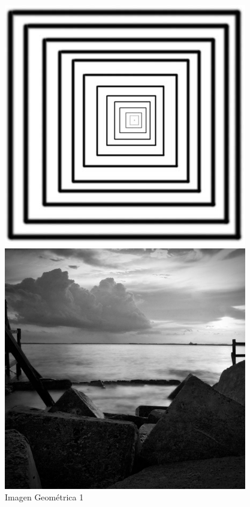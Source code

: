 \documentclass{article}
\begin{document}
\begin{figure}[H]
  \includegraphics[width=\linewidth]{geometrica_1}
  \caption{Imagen Geométrica 1}\label{fig:geometrica_1}
\endminipage\hfill
{}
  \includegraphics[width=\linewidth]{paisaje_1}

\end{figure}
\end{document}
